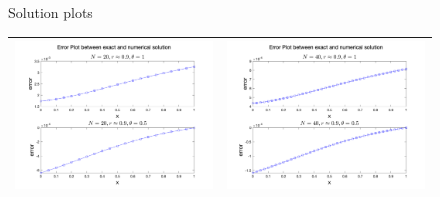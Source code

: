 \documentclass[11pt]{article}
\begin{document}
\begin{enumerate}
\begin{enumerate}
\begin{figure}[htp]
\begin{tabular}{|c|c|}
    \hline
    \end{tabular}
    \caption{Solution plots}
    \label{fig:q21}
    \end{figure}
    
    \begin{figure}[htp]
    \begin{tabular}{|c|c|}
    \hline
    \includegraphics[width=3.5in]{N1} & \includegraphics[width=3.5in]{N2} \\
    \hline
    \end{tabular}
    \begin{tabular}{|c|c|}
    \hline

\end{tabular}
\end{figure}
\end{enumerate}
\end{enumerate}
\end{document}
